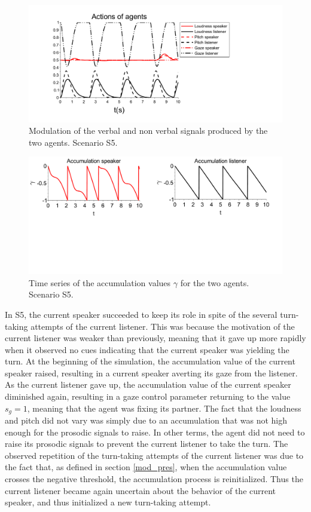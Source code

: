 \begin{figure}
  \centering
  \includegraphics[width=\linewidth]{figure/emerg_sc2.pdf}
  \caption{Modulation of the verbal and non verbal signals produced by the two agents. Scenario S5.}
  \label{simu_buttin}
\end{figure}

\begin{figure}
  \centering
  \includegraphics[width=\linewidth]{figure/acc_sc2_small.pdf}
  \caption{Time series of the accumulation values $\gamma$ for the two agents. Scenario S5.}
  \label{acc_buttin}
\end{figure}

In S5, the current speaker succeeded to keep its role in spite of the several turn-taking attempts of the current listener. This was because the motivation of the current listener was weaker than previously, meaning that it gave up more rapidly when it observed no cues indicating that the current speaker was yielding the turn. At the beginning of the simulation, the accumulation value of the current speaker raised, resulting in a current speaker averting its gaze from the listener. As the current listener gave up, the accumulation value of the current speaker diminished again, resulting in a gaze control parameter returning to the value $s_g=1$, meaning that the agent was fixing its partner. The fact that the loudness and pitch did not vary was simply due to an accumulation that was not high enough for the prosodic signals to raise. In other terms, the agent did not need to raise its prosodic signals to prevent the current listener to take the turn. The observed repetition of the turn-taking attempts of the current listener was due to the fact that, as defined in section \ref{mod_pres}, when the accumulation value crosses the negative threshold, the accumulation process is reinitialized. Thus the current listener became again uncertain about the behavior of the current speaker, and thus initialized a new turn-taking attempt. 


